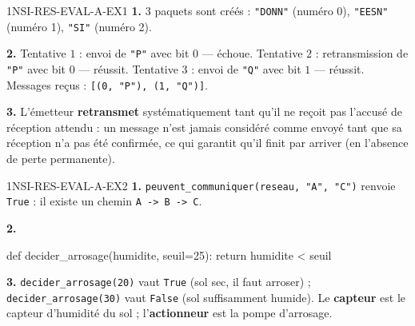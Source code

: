 \begin{corrige}{1NSI-RES-EVAL-A-EX1}
\textbf{1.} $3$ paquets sont créés : \lstinline{"DONN"} (numéro 0), \lstinline{"EESN"}
(numéro 1), \lstinline{"SI"} (numéro 2).

\textbf{2.} Tentative $1$ : envoi de \lstinline{"P"} avec bit $0$ — échoue. Tentative $2$ :
retransmission de \lstinline{"P"} avec bit $0$ — réussit. Tentative $3$ : envoi de
\lstinline{"Q"} avec bit $1$ — réussit. Messages reçus : \lstinline{[(0, "P"), (1, "Q")]}.

\textbf{3.} L'émetteur \textbf{retransmet} systématiquement tant qu'il ne reçoit pas
l'accusé de réception attendu : un message n'est jamais considéré comme envoyé tant que sa
réception n'a pas été confirmée, ce qui garantit qu'il finit par arriver (en l'absence de
perte permanente).
\end{corrige}

\begin{corrige}{1NSI-RES-EVAL-A-EX2}
\textbf{1.} \lstinline{peuvent_communiquer(reseau, "A", "C")} renvoie \lstinline{True} :
il existe un chemin \lstinline{A -> B -> C}.

\textbf{2.}
\begin{python}
def decider_arrosage(humidite, seuil=25):
    return humidite < seuil
\end{python}

\textbf{3.} \lstinline{decider_arrosage(20)} vaut \lstinline{True} (sol sec, il faut
arroser) ; \lstinline{decider_arrosage(30)} vaut \lstinline{False} (sol suffisamment
humide). Le \textbf{capteur} est le capteur d'humidité du sol ; l'\textbf{actionneur} est
la pompe d'arrosage.
\end{corrige}
